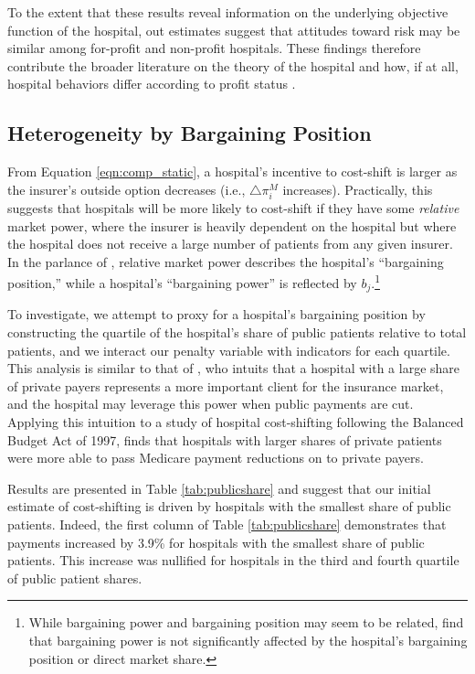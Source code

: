 \documentclass[12pt]{article}
\begin{document}
To the extent that these results reveal information on the underlying objective function of the hospital, out estimates suggest that attitudes toward risk may be similar among for-profit and non-profit hospitals. These findings therefore contribute the broader literature on the theory of the hospital and how, if at all, hospital behaviors differ according to profit status \citep{sloan2001,duggan2002,horwitz2005,horwitz2009,david2009}.

\subsection{Heterogeneity by Bargaining Position}
From Equation \ref{eqn:comp_static}, a hospital's incentive to cost-shift is larger as the insurer's outside option decreases (i.e., $\triangle \pi_{i}^{M}$ increases). Practically, this suggests that hospitals will be more likely to cost-shift if they have some \textit{relative} market power, where the insurer is heavily dependent on the hospital but where the hospital does not receive a large number of patients from any given insurer. In the parlance of \cite{lewis2015}, relative market power describes the hospital's ``bargaining position,'' while a hospital's ``bargaining power'' is reflected by $b_{j}$.\footnote{While bargaining power and bargaining position may seem to be related, \cite{lewis2015} find that bargaining power is not significantly affected by the hospital's bargaining position or direct market share.}

To investigate, we attempt to proxy for a hospital's bargaining position by constructing the quartile of the hospital's share of public patients relative to total patients, and we interact our penalty variable with indicators for each quartile. This analysis is similar to that of \cite{wu2010}, who intuits that a hospital with a large share of private payers represents a more important client for the insurance market, and the hospital may leverage this power when public payments are cut. Applying this intuition to a study of hospital cost-shifting following the Balanced Budget Act of 1997, \cite{wu2010} finds that hospitals with larger shares of private patients were more able to pass Medicare payment reductions on to private payers.

Results are presented in Table \ref{tab:publicshare} and suggest that our initial estimate of cost-shifting is driven by hospitals with the smallest share of public patients. Indeed, the first column of Table \ref{tab:publicshare} demonstrates that payments increased by 3.9\% for hospitals with the smallest share of public patients. This increase was nullified for hospitals in the third and fourth quartile of public patient shares.
\end{document}
